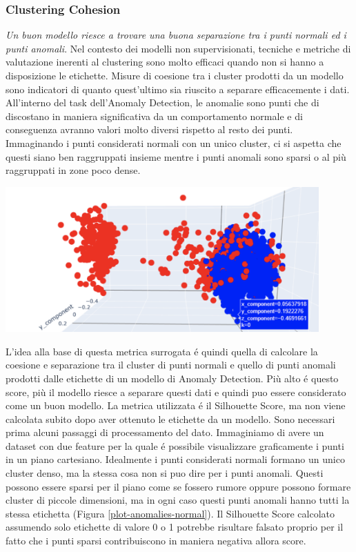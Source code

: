 \subsubsection{Clustering Cohesion}
\textit{Un buon modello riesce a trovare una buona separazione tra i punti normali ed i punti anomali}.
Nel contesto dei modelli non supervisionati, tecniche e metriche di valutazione inerenti al clustering sono molto efficaci quando non si hanno a disposizione le etichette. Misure di coesione tra i cluster prodotti da un modello sono indicatori di quanto quest'ultimo sia riuscito a separare efficacemente i dati.
All'interno del task dell'Anomaly Detection, le anomalie sono punti che di discostano in maniera significativa da un comportamento normale e di conseguenza avranno valori molto diversi rispetto al resto dei punti. Immaginando i punti considerati normali con un unico cluster, ci si aspetta che questi siano ben raggruppati insieme mentre i punti anomali sono sparsi o al più raggruppati in zone poco dense.
\begin{center}
	\includegraphics[width=12cm, scale=1]{images/plot-anomalies-normal}
    \captionsetup{type=figure}
    \label{plot-anomalies-normal}
\end{center}
L'idea alla base di questa metrica surrogata é quindi quella di calcolare la coesione e separazione tra il cluster di punti normali e quello di punti anomali prodotti dalle etichette di un modello di Anomaly Detection. Più alto é questo score, più il modello riesce a separare questi dati e quindi puo essere considerato come un buon modello.
La metrica utilizzata é il Silhouette Score, ma non viene calcolata subito dopo aver ottenuto le etichette da un modello. Sono necessari prima alcuni passaggi di processamento del dato.
Immaginiamo di avere un dataset con due feature per la quale é possibile visualizzare graficamente i punti in un piano cartesiano. Idealmente i punti considerati normali formano un unico cluster denso, ma la stessa cosa non si puo dire per i punti anomali. 
Questi possono essere sparsi per il piano come se fossero rumore oppure possono formare cluster di piccole dimensioni, ma in ogni caso questi punti anomali hanno tutti la stessa etichetta (Figura \ref{plot-anomalies-normal}).
Il Silhouette Score calcolato assumendo solo etichette di valore 0 o 1 potrebbe risultare falsato proprio per il fatto che i punti sparsi contribuiscono in maniera negativa allora score.

